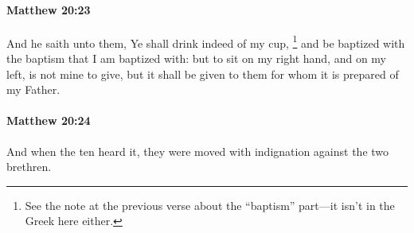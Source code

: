 		\paragraph{Matthew 20:23} %
			\label{MATTHEW-20-23}

			And he saith unto them, Ye shall drink indeed of my cup,
				\footnote{%
					See the note at the previous verse about the ``baptism'' part---it isn't in the Greek here either.
					}
			and be baptized with the baptism that I am baptized with: but to sit on my right hand, and on my left, is not mine to give, but it shall be given to them for whom it is prepared of my Father.

			\begin{framed}
			\scriptsize
				\begin{compactdesc}
					\item[SBLG] 
				\end{compactdesc}
			\end{framed}

		\paragraph{Matthew 20:24} %
			\label{MATTHEW-20-24}

			And when the ten heard it, they were moved with indignation against the two brethren.

